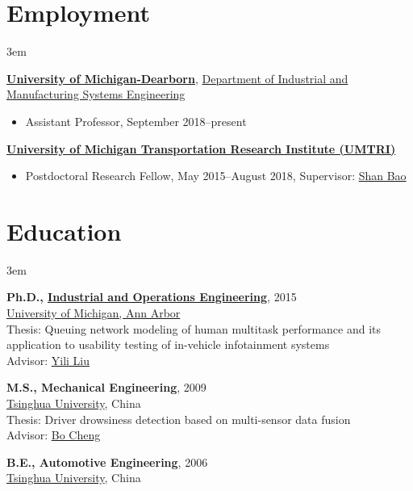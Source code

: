 \documentclass[11pt]{article}
\newenvironment{main}
{\begin{adjustwidth}{3em}{}}
{\end{adjustwidth}}
\begin{document}
\section*{Employment}
\begin{main}

\href{https://umdearborn.edu/}{\textbf{University of Michigan-Dearborn}}, \href{https://umdearborn.edu/cecs/departments/industrial-and-manufacturing-systems-engineering}{Department of Industrial and Manufacturing Systems Engineering}

\begin{itemize}
    \item[] Assistant Professor, September 2018–present
\end{itemize}

\href{http://www.umtri.umich.edu/}{\textbf{University of Michigan Transportation Research Institute (UMTRI)}}

\begin{itemize}
    \item[] Postdoctoral Research Fellow, May 2015–August 2018, Supervisor: \href{https://sites.google.com/umich.edu/hfet-lab/people}{Shan Bao}
\end{itemize}


\end{main}
\section*{Education}
\begin{main}

\textbf{Ph.D., \href{https://ioe.engin.umich.edu/}{Industrial and Operations Engineering}}, 2015\\
\href{https://umich.edu/}{University of Michigan, Ann Arbor}\\
Thesis: Queuing network modeling of human multitask performance and its application to usability testing of in-vehicle infotainment systems\\
Advisor: \href{https://ioe.engin.umich.edu/people/yili-liu/}{Yili Liu}

\textbf{M.S., Mechanical Engineering}, 2009\\
\href{https://www.tsinghua.edu.cn/en/index.htm}{Tsinghua University}, China\\
Thesis: Driver drowsiness detection based on multi-sensor data fusion\\
Advisor: \href{http://www.svm.tsinghua.edu.cn/essay/74/364.html}{Bo Cheng}

\textbf{B.E., Automotive Engineering}, 2006\\
\href{https://www.tsinghua.edu.cn/en/index.htm}{Tsinghua University}, China


\end{main}
\end{document}
